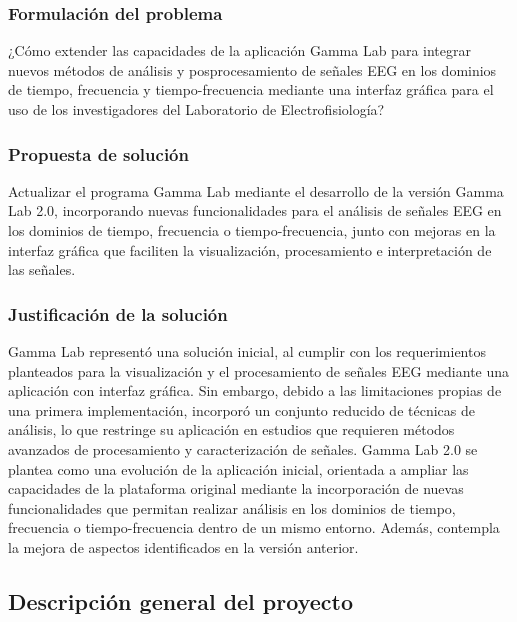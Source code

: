 \documentclass[12pt,letterpaper]{article}
\begin{document}
\subsubsection{Formulación del problema}

¿Cómo extender las capacidades de la aplicación Gamma Lab para integrar nuevos métodos de análisis y posprocesamiento de señales EEG en los dominios de tiempo, frecuencia y tiempo-frecuencia mediante una interfaz gráfica para el uso de los investigadores del Laboratorio de Electrofisiología?

\subsubsection{Propuesta de solución}

Actualizar el programa Gamma Lab mediante el desarrollo de la versión Gamma Lab 2.0, incorporando nuevas funcionalidades para el análisis de señales EEG en los dominios de tiempo, frecuencia o tiempo-frecuencia, junto con mejoras en la interfaz gráfica que faciliten la visualización, procesamiento e interpretación de las señales.  

\subsubsection{Justificación de la solución}

Gamma Lab representó una solución inicial, al cumplir con los requerimientos planteados para la visualización y el procesamiento de señales EEG mediante una aplicación con interfaz gráfica. Sin embargo, debido a las limitaciones propias de una primera implementación, incorporó un conjunto reducido de técnicas de análisis, lo que restringe su aplicación en estudios que requieren métodos avanzados de procesamiento y caracterización de señales. Gamma Lab 2.0 se plantea como una evolución de la aplicación inicial, orientada a ampliar las capacidades de la plataforma original mediante la incorporación de nuevas funcionalidades que permitan realizar análisis en los dominios de tiempo, frecuencia o tiempo-frecuencia dentro de un mismo entorno. Además, contempla la mejora de aspectos identificados en la versión anterior.

\subsection{Descripción general del proyecto}
\end{document}
